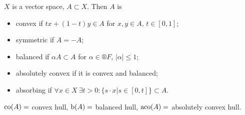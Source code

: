 \documentclass[12pt]{article}					%
\begin{document}
\begin{definice}
	$X$ is a vector space, $A \subset X$. Then $A$ is
	\begin{itemize}
		\item convex if $tx + (1 - t)y \in A$ for $x, y \in A$, $t \in [0, 1]$;
		\item symmetric if $A = -A$;
		\item balanced if $α A \subset A$ for $α \in ®F$, $|α| ≤ 1$;
		\item absolutely convex if it is convex and balanced;
		\item absorbing if $\forall x \in X\ \exists t > 0: \{s·x | s \in [0, t]\} \subset A$.
	\end{itemize}
\end{definice}

\begin{definice}
	$\operatorname{co}(A) = $ convex hull, $\operatorname{b}(A) = $ balanced hull, $\operatorname{aco}(A) = $ absolutely convex hull.
\end{definice}
\end{document}
